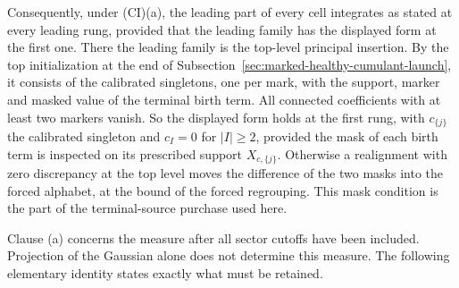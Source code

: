 Consequently, under (CI)(a), the leading part of every cell integrates as
stated at every leading rung, provided that the leading family has the
displayed form at the first one. There the leading family is the
top-level principal insertion. By the top initialization at the end of
Subsection~\ref{sec:marked-healthy-cumulant-launch}, it consists of the
calibrated singletons, one per mark, with the support, marker and masked
value of the terminal birth term. All connected coefficients with at least
two markers vanish. So the displayed form holds at the first rung, with
$c_{\{j\}}$ the calibrated singleton and $c_I=0$ for $|I|\ge2$, provided
the mask of each birth term is inspected on its prescribed support
$X_{c,\{j\}}$. Otherwise a realignment with zero discrepancy at the top
level moves the difference of the two masks into the forced alphabet, at
the bound of the forced regrouping. This mask condition is the part of the
terminal-source purchase used here.

Clause (a) concerns the measure after all sector cutoffs have been
included. Projection of the Gaussian alone does not determine this
measure. The following elementary identity states exactly what must be
retained.

